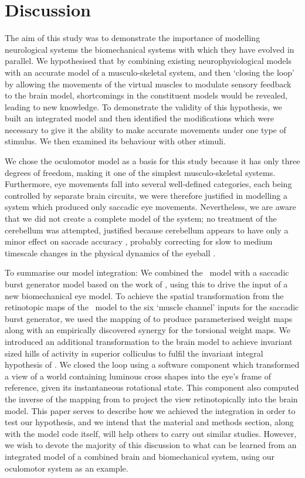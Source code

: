 \documentclass{frontiersSCNS}
\begin{document}
\section{Discussion}

The aim of this study was to demonstrate the importance of modelling
neurological systems  the biomechanical systems
with which they have evolved in parallel. We hypothesised that by
combining existing neurophysiological models with an accurate model of
a musculo-skeletal system, and then `closing the loop' by allowing the
movements of the virtual muscles to modulate sensory feedback to the
brain model, shortcomings in the constituent models would be revealed,
leading to new knowledge. To demonstrate the validity of this
hypothesis, we built an integrated model and then identified the
modifications which were necessary to give it the ability to make
accurate movements under one type of stimulus. We then examined its
behaviour with other stimuli.

We chose the oculomotor model as a basis for this study because it has
only three degrees of freedom, making it one of the simplest
musculo-skeletal systems. Furthermore, eye movements fall into several
well-defined categories, each being controlled by separate brain
circuits, we were therefore justified in modelling a system which
produced only saccadic eye movements. Nevertheless, we are aware that
we did not create a complete model of the system; no treatment of the
cerebellum was attempted, justified because cerebellum appears to have
only a minor effect on saccade accuracy \citep{dean_adaptive_2008},
probably correcting for slow to medium timescale changes in the
physical dynamics of the eyeball \citep{dean_learning_1994}.

To summarise our model integration: We combined
the \ccg~model \citep{cope_basal_2017} with a saccadic burst generator
model based on the work of \cite{gancarz_neural_1998}, using this to
drive the input of a new biomechanical eye model. To achieve the
spatial transformation from the retinotopic maps of the \ccg~model to
the six `muscle channel' inputs for the saccadic burst generator, we
used the mapping of \cite{ottes_visuomotor_1986} to produce
parameterised weight maps along with an empirically discovered synergy
for the torsional weight maps. We introduced an additional
transformation to the brain model to achieve invariant sized hills of
activity in superior colliculus to fulfil the invariant integral
hypothesis of \cite{tabareau_geometry_2007}. We closed the loop using
a software component which transformed a view of a world containing
luminous cross shapes into the eye's frame of reference, given its
instantaneous rotational state. This component also computed the
inverse of the mapping from \cite{ottes_visuomotor_1986} to project
the view retinotopically into the brain model.
%
This paper serves to describe how we achieved the integration in order
to test our hypothesis, and we intend that the material and methods
section, along with the model code itself, will help others to carry
out similar studies. However, we wish to devote the majority of this
discussion to what can be learned from an integrated model of a
combined brain and biomechanical system, using our oculomotor system
as an example.
\end{document}
